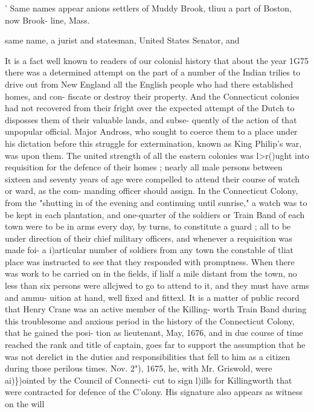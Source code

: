\documentclass{book}
\begin{document}
' Same names appear anions settlers of Muddy Brook, tliuu a part of Boston, now Brook- 
line, Mass. 




same name, a jurist and statesman, United States Senator, and 

It is a fact well known to readers of our colonial history that 
about the year 1G75 there was a determined attempt on the part 
of a number of the Indian trilies to drive out from New England 
all the English people who had there established homes, and con- 
fiscate or destroy their property. And the Connecticut colonies 
had not recovered from their fright over the expected attempt of 
the Dutch to disposses them of their valuable lands, and subse- 
quently of the action of that unpopular official. Major Andross, 
who sought to coerce them to a place under his dictation before 
this struggle for extermination, known as King Philip's war, was 
upon them. The united strength of all the eastern colonies was 
l>r()ught into requisition for the defence of their homes ; nearly 
all male persons between sixteen and seventy years of age were 
compelled to attend their course of watch or ward, as the com- 
manding officer should assign. In the Connecticut Colony, from 
the "shutting in of the evening and continuing until sunrise," a 
watch was to be kept in each plantation, and one-quarter of the 
soldiers or Train Band of each town were to be in arms every 
day, by turns, to constitute a guard ; all to be under direction of 
their chief military officers, and whenever a requisition was made 
foi- a i)articular number of soldiers from any town the constable 
of tliat place was instructed to see that they responded with 
promptness. When there was work to be carried on in the fields, 
if lialf a mile distant from the town, no less than six persons were 
allcjwed to go to attend to it, and they must have arms and ammu- 
uition at hand, well fixed and fittexl. It is a matter of public 
record that Henry Crane was an active member of the Killing- 
worth Train Band during this troublesome and anxious period in 
the history of the Connecticut Colony, that he gained the posi- 
tion as lieutenant, May, 1676, and in due course of time reached 
the rank and title of captain, goes far to support the assumption 
that he was not derelict in the duties and responsibilities that fell 
to him as a citizen during those perilous times. Nov. 2"), 1675, 
he, with Mr. Griswold, were ai)\})ointed by the Council of Connecti- 
cut to sign l)ills for Killingworth that were contracted for defence 
of the C'olony. His signature also appears as witness on the will 
\end{document}
